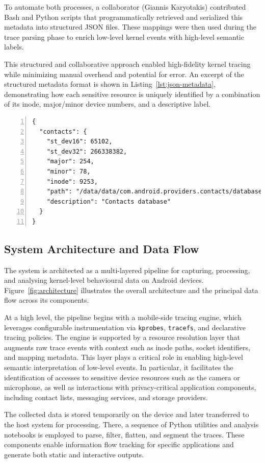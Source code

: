 \documentclass[a4paper,12pt]{report}
\begin{document}
To automate both processes, a collaborator (Giannis Karyotakis) contributed Bash and Python scripts that programmatically retrieved and serialized this metadata into structured JSON files. These mappings were then used during the trace parsing phase to enrich low-level kernel events with high-level semantic labels.

This structured and collaborative approach enabled high-fidelity kernel tracing while minimizing manual overhead and potential for error.
An excerpt of the structured metadata format is shown in Listing~\ref{lst:json-metadata}, demonstrating how each sensitive resource is uniquely identified by a combination of its inode, major/minor device numbers, and a descriptive label.

\begin{lstlisting}[caption={Serialized JSON metadata for sensitive resource mapping},label={lst:json-metadata},numbers=left]
{
  "contacts": {
    "st_dev16": 65102,
    "st_dev32": 266338382,
    "major": 254,
    "minor": 78,
    "inode": 9253,
    "path": "/data/data/com.android.providers.contacts/databases/contacts2.db",
    "description": "Contacts database"
  }
}
\end{lstlisting}

\subsection{System Architecture and Data Flow}

The system is architected as a multi-layered pipeline for capturing, processing, and analysing kernel-level behavioural data on Android devices. Figure~\ref{fig:architecture} illustrates the overall architecture and the principal data flow across its components.

At a high level, the pipeline begins with a mobile-side tracing engine, which leverages configurable instrumentation via \texttt{kprobes}, \texttt{tracefs}, and declarative tracing policies. The engine is supported by a resource resolution layer that augments raw trace events with context such as inode paths, socket identifiers, and mapping metadata. This layer plays a critical role in enabling high-level semantic interpretation of low-level events. In particular, it facilitates the identification of accesses to sensitive device resources such as the camera or microphone, as well as interactions with privacy-critical application components, including contact lists, messaging services, and storage providers.

The collected data is stored temporarily on the device and later transferred to the host system for processing. There, a sequence of Python utilities and analysis notebooks is employed to parse, filter, flatten, and segment the traces. These components enable information flow tracking for specific applications and generate both static and interactive outputs.
\end{document}

